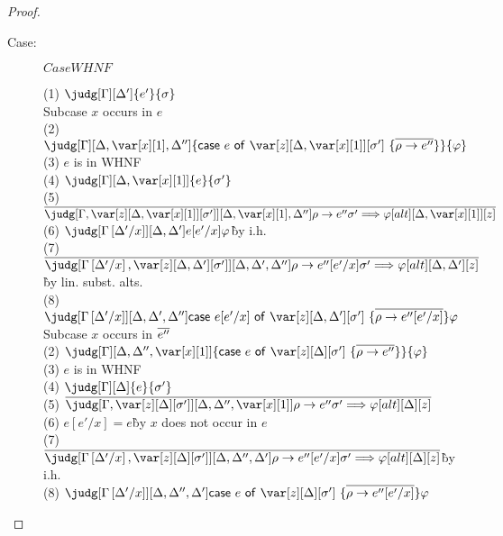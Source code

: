 \begin{proof}
\begin{description}
\item[Case:] $CaseWHNF$
\begin{tabbing}
  (1) $\judg[\G][\D']{e'}{\s}$\\
  Subcase $x$ occurs in $e$\\
  (2) $\judg[\G][\D,\xl,\D'']{\ccase{e}{\z[\D,\xl][\s']~\{\ov{\rho\to e''}\}}}{\vp}$\\
  (3) $e$ is in WHNF\\
  (4) $\judg[\G][\D,\xl]{e}{\s'}$\\
    (5) $\ov{\judg[\G,\zr{\D,\xl}{\s'}][\D,\xl,\D'']{\rho\to e''}{\s' \Longrightarrow \vp}[alt][\D,\xl][z]}$\\
  (6) $\judg[\subst{\G}{\D'}{x}][\D,\D']{e[e'/x]}{\vp}$\`by i.h.\\
    (7) $\ov{\judg[\subst{\G}{\D'}{x},\zr{\D,\D'}{\s'}][\D,\D',\D'']{\rho\to e''[e'/x]}{\s' \Longrightarrow \vp}[alt][\D,\D'][z]}$\` by lin. subst. alts.\\
  (8) $\judg[\subst{\G}{\D'}{x}][\D,\D',\D'']{\ccase{e[e'/x]}{\z[\D,\D'][\s']~\{\ov{\rho\to e''[e'/x]}\}}}{\vp}$\\
  Subcase $x$ occurs in $\overline{e''}$\\
  (2) $\judg[\G][\D,\D'',\xl]{\ccase{e}{\z[\D][\s']~\{\ov{\rho\to e''}\}}}{\vp}$\\
  (3) $e$ is in WHNF\\
  (4) $\judg[\G][\D]{e}{\s'}$\\
    (5) $\ov{\judg[\G,\zr{\D}{\s'}][\D,\D'',\xl]{\rho\to e''}{\s' \Longrightarrow \vp}[alt][\D][z]}$\\
  (6) $e[e'/x] = e$\` by $x$ does not occur in $e$\\
    (7) $\ov{\judg[\subst{\G}{\D'}{x},\zr{\D}{\s'}][\D,\D'',\D']{\rho\to e''[e'/x]}{\s' \Longrightarrow \vp}[alt][\D][z]}$\`by i.h.\\
  (8) $\judg[\subst{\G}{\D'}{x}][\D,\D'',\D']{\ccase{e}{\z[\D][\s']~\{\ov{\rho\to e''[e'/x]}\}}}{\vp}$\\
\end{tabbing}


\end{description}
\end{proof}
